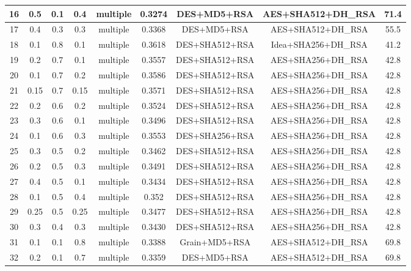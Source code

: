 \documentclass[3p,times]{elsarticle}
\begin{document}
\begin{table*}[!hp]
{\begin{tabular}{|c|c|c|c|c|c|c|c|c| }
16&0.5&         0.1&	        0.4&	multiple&		0.3274&    DES+MD5+RSA&AES+SHA512+DH\_RSA&71.4\\\hline
17&0.4&         0.3&	        0.3&	multiple&		0.3368&    DES+MD5+RSA&AES+SHA512+DH\_RSA&55.5\\\hline
18&0.1&             0.8&	          0.1&	multiple&	          0.3618&    DES+SHA512+RSA&Idea+SHA256+DH\_RSA&41.2\\\hline
19&0.2&             0.7&	          0.1&	multiple&	          0.3557&    DES+SHA512+RSA&AES+SHA256+DH\_RSA&42.8\\\hline
20&0.1&             0.7&	          0.2&	multiple&	          0.3586&    DES+SHA512+RSA&AES+SHA256+DH\_RSA&42.8\\\hline
21&0.15&             0.7&	          0.15&	multiple&	          0.3571&    DES+SHA512+RSA&AES+SHA256+DH\_RSA&42.8\\\hline
22&0.2&             0.6&	          0.2&	multiple&	          0.3524&    DES+SHA512+RSA&AES+SHA256+DH\_RSA&42.8\\\hline
23&0.3&             0.6&	          0.1&	multiple&	          0.3496&   DES+SHA512+RSA&AES+SHA256+DH\_RSA&42.8\\\hline
24&0.1&             0.6&	          0.3&	multiple&	          0.3553&   DES+SHA256+RSA&AES+SHA256+DH\_RSA&42.8\\\hline
25&0.3&             0.5&	          0.2&	multiple&	          0.3462&    DES+SHA512+RSA&AES+SHA256+DH\_RSA&42.8\\\hline
26&0.2&             0.5&	          0.3&	multiple&	          0.3491&    DES+SHA512+RSA&AES+SHA256+DH\_RSA&42.8\\\hline
27&0.4&             0.5&	          0.1&	multiple&	          0.3434&   DES+SHA512+RSA&AES+SHA256+DH\_RSA&42.8\\\hline
28&0.1&             0.5&	          0.4&	multiple&	          0.352&     DES+SHA512+RSA&AES+SHA256+DH\_RSA&42.8\\\hline
29&0.25&             0.5&	          0.25&	multiple&	          0.3477&    DES+SHA512+RSA&AES+SHA256+DH\_RSA&42.8\\\hline
30&0.3&             0.4&	          0.3&	multiple&	          0.3430&    DES+SHA512+RSA&AES+SHA256+DH\_RSA&42.8\\\hline
31&0.1&             0.1&	          0.8&	multiple&	          0.3388&    Grain+MD5+RSA&AES+SHA512+DH\_RSA&69.8\\\hline
32&0.2&             0.1&	          0.7&	multiple&	          0.3359&    DES+MD5+RSA&AES+SHA512+DH\_RSA&69.8\\\hline

\end{tabular}}
\end{table*}
\end{document}
